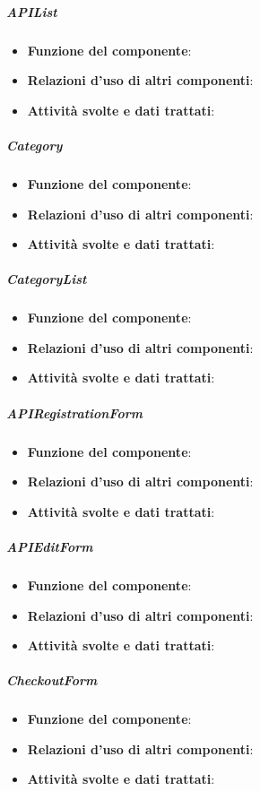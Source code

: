 \subparagraph{APIList}
\begin{itemize}
	\item \textbf{Funzione del componente}: 
	\item \textbf{Relazioni d’uso di altri componenti}: 
	\item \textbf{Attività svolte e dati trattati}: 
\end{itemize}

\subparagraph{Category}
\begin{itemize}
	\item \textbf{Funzione del componente}: 
	\item \textbf{Relazioni d’uso di altri componenti}: 
	\item \textbf{Attività svolte e dati trattati}: 
\end{itemize}

\subparagraph{CategoryList}
\begin{itemize}
	\item \textbf{Funzione del componente}: 
	\item \textbf{Relazioni d’uso di altri componenti}: 
	\item \textbf{Attività svolte e dati trattati}: 
\end{itemize}

\subparagraph{APIRegistrationForm}
\begin{itemize}
	\item \textbf{Funzione del componente}: 
	\item \textbf{Relazioni d’uso di altri componenti}: 
	\item \textbf{Attività svolte e dati trattati}: 
\end{itemize}

\subparagraph{APIEditForm}
\begin{itemize}
	\item \textbf{Funzione del componente}: 
	\item \textbf{Relazioni d’uso di altri componenti}: 
	\item \textbf{Attività svolte e dati trattati}: 
\end{itemize}

\subparagraph{CheckoutForm}
\begin{itemize}
	\item \textbf{Funzione del componente}: 
	\item \textbf{Relazioni d’uso di altri componenti}: 
	\item \textbf{Attività svolte e dati trattati}: 
\end{itemize}

